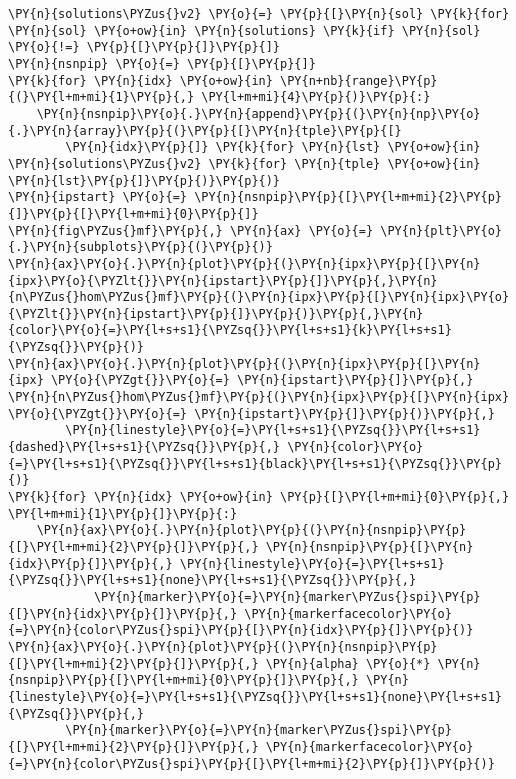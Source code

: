 \begin{Verbatim}[commandchars=\\\{\}]
\PY{n}{solutions\PYZus{}v2} \PY{o}{=} \PY{p}{[}\PY{n}{sol} \PY{k}{for} \PY{n}{sol} \PY{o+ow}{in} \PY{n}{solutions} \PY{k}{if} \PY{n}{sol} \PY{o}{!=} \PY{p}{[}\PY{p}{]}\PY{p}{]}
\PY{n}{nsnpip} \PY{o}{=} \PY{p}{[}\PY{p}{]}
\PY{k}{for} \PY{n}{idx} \PY{o+ow}{in} \PY{n+nb}{range}\PY{p}{(}\PY{l+m+mi}{1}\PY{p}{,} \PY{l+m+mi}{4}\PY{p}{)}\PY{p}{:}
    \PY{n}{nsnpip}\PY{o}{.}\PY{n}{append}\PY{p}{(}\PY{n}{np}\PY{o}{.}\PY{n}{array}\PY{p}{(}\PY{p}{[}\PY{n}{tple}\PY{p}{[}
        \PY{n}{idx}\PY{p}{]} \PY{k}{for} \PY{n}{lst} \PY{o+ow}{in} \PY{n}{solutions\PYZus{}v2} \PY{k}{for} \PY{n}{tple} \PY{o+ow}{in} \PY{n}{lst}\PY{p}{]}\PY{p}{)}\PY{p}{)}
\PY{n}{ipstart} \PY{o}{=} \PY{n}{nsnpip}\PY{p}{[}\PY{l+m+mi}{2}\PY{p}{]}\PY{p}{[}\PY{l+m+mi}{0}\PY{p}{]}
\PY{n}{fig\PYZus{}mf}\PY{p}{,} \PY{n}{ax} \PY{o}{=} \PY{n}{plt}\PY{o}{.}\PY{n}{subplots}\PY{p}{(}\PY{p}{)}
\PY{n}{ax}\PY{o}{.}\PY{n}{plot}\PY{p}{(}\PY{n}{ipx}\PY{p}{[}\PY{n}{ipx}\PY{o}{\PYZlt{}}\PY{n}{ipstart}\PY{p}{]}\PY{p}{,}\PY{n}{n\PYZus{}hom\PYZus{}mf}\PY{p}{(}\PY{n}{ipx}\PY{p}{[}\PY{n}{ipx}\PY{o}{\PYZlt{}}\PY{n}{ipstart}\PY{p}{]}\PY{p}{)}\PY{p}{,}\PY{n}{color}\PY{o}{=}\PY{l+s+s1}{\PYZsq{}}\PY{l+s+s1}{k}\PY{l+s+s1}{\PYZsq{}}\PY{p}{)}
\PY{n}{ax}\PY{o}{.}\PY{n}{plot}\PY{p}{(}\PY{n}{ipx}\PY{p}{[}\PY{n}{ipx} \PY{o}{\PYZgt{}}\PY{o}{=} \PY{n}{ipstart}\PY{p}{]}\PY{p}{,} \PY{n}{n\PYZus{}hom\PYZus{}mf}\PY{p}{(}\PY{n}{ipx}\PY{p}{[}\PY{n}{ipx} \PY{o}{\PYZgt{}}\PY{o}{=} \PY{n}{ipstart}\PY{p}{]}\PY{p}{)}\PY{p}{,}
        \PY{n}{linestyle}\PY{o}{=}\PY{l+s+s1}{\PYZsq{}}\PY{l+s+s1}{dashed}\PY{l+s+s1}{\PYZsq{}}\PY{p}{,} \PY{n}{color}\PY{o}{=}\PY{l+s+s1}{\PYZsq{}}\PY{l+s+s1}{black}\PY{l+s+s1}{\PYZsq{}}\PY{p}{)}
\PY{k}{for} \PY{n}{idx} \PY{o+ow}{in} \PY{p}{[}\PY{l+m+mi}{0}\PY{p}{,} \PY{l+m+mi}{1}\PY{p}{]}\PY{p}{:}
    \PY{n}{ax}\PY{o}{.}\PY{n}{plot}\PY{p}{(}\PY{n}{nsnpip}\PY{p}{[}\PY{l+m+mi}{2}\PY{p}{]}\PY{p}{,} \PY{n}{nsnpip}\PY{p}{[}\PY{n}{idx}\PY{p}{]}\PY{p}{,} \PY{n}{linestyle}\PY{o}{=}\PY{l+s+s1}{\PYZsq{}}\PY{l+s+s1}{none}\PY{l+s+s1}{\PYZsq{}}\PY{p}{,}
            \PY{n}{marker}\PY{o}{=}\PY{n}{marker\PYZus{}spi}\PY{p}{[}\PY{n}{idx}\PY{p}{]}\PY{p}{,} \PY{n}{markerfacecolor}\PY{o}{=}\PY{n}{color\PYZus{}spi}\PY{p}{[}\PY{n}{idx}\PY{p}{]}\PY{p}{)}
\PY{n}{ax}\PY{o}{.}\PY{n}{plot}\PY{p}{(}\PY{n}{nsnpip}\PY{p}{[}\PY{l+m+mi}{2}\PY{p}{]}\PY{p}{,} \PY{n}{alpha} \PY{o}{*} \PY{n}{nsnpip}\PY{p}{[}\PY{l+m+mi}{0}\PY{p}{]}\PY{p}{,} \PY{n}{linestyle}\PY{o}{=}\PY{l+s+s1}{\PYZsq{}}\PY{l+s+s1}{none}\PY{l+s+s1}{\PYZsq{}}\PY{p}{,}
        \PY{n}{marker}\PY{o}{=}\PY{n}{marker\PYZus{}spi}\PY{p}{[}\PY{l+m+mi}{2}\PY{p}{]}\PY{p}{,} \PY{n}{markerfacecolor}\PY{o}{=}\PY{n}{color\PYZus{}spi}\PY{p}{[}\PY{l+m+mi}{2}\PY{p}{]}\PY{p}{)}

\end{Verbatim}
